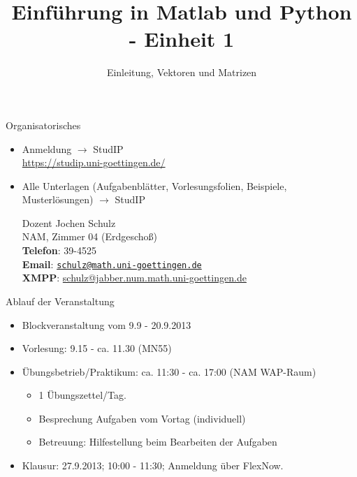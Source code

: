 \documentclass[hyperref={xetex}]{beamer}
\title{Einführung in Matlab und Python - Einheit 1}
\subtitle{Einleitung, Vektoren und Matrizen}
\begin{document}
\titlepage


\begin{frame}{Organisatorisches}
\begin{itemize}
\item Anmeldung $\rightarrow$ StudIP \\
      \url{https://studip.uni-goettingen.de/}

{\color{blue}{Einführung in Matlab und Python (Mathematische Anwendersysteme)}}
\item Alle Unterlagen (Aufgabenblätter, Vorlesungsfolien, Beispiele, Musterlösungen) $\rightarrow$ StudIP
\pause
\begin{block}{Dozent}
Jochen Schulz\\
NAM, Zimmer 04 (Erdgescho{\ss})\\
\textbf{Telefon}: 39-4525\\
\textbf{Email}: \href{mailto:schulz@math.uni-goettingen.de}{\texttt{schulz@math.uni-goettingen.de}}\\
\textbf{XMPP}: \url{schulz@jabber.num.math.uni-goettingen.de}\\

\end{block}
\end{itemize}
\end{frame}


\begin{frame}{Ablauf der Veranstaltung}
\begin{itemize}
\item Blockveranstaltung vom  9.9 - 20.9.2013
\item \alert{Vorlesung:} 9.15 - ca. 11.30  (MN55)
\item \alert{Übungsbetrieb/Praktikum}: ca. 11:30 - ca. 17:00  (NAM WAP-Raum)
\begin{itemize}
\item 1 Übungszettel/Tag.
\item Besprechung Aufgaben vom Vortag (individuell)
\item Betreuung: Hilfestellung beim Bearbeiten der Aufgaben
\end{itemize}
\item \alert{Klausur:} 27.9.2013; 10:00 - 11:30; Anmeldung über FlexNow.
\end{itemize}

\end{frame}
\end{document}
